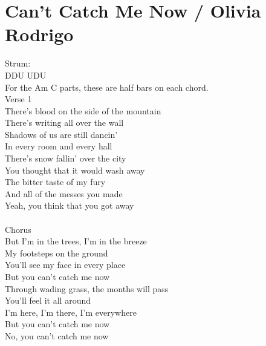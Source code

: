 \section{Can't Catch Me Now / Olivia Rodrigo}\label{sec:cantcatchmenow}

\Aminor
\Cmajor
\Fmajor
\Dminor
\Gmajor
\Eminor

Strum: \\
DDU UDU \\

For the Am C parts, these are half bars on each chord.\\

Verse 1\\
There's blood on the side of the mountain\\
There's writing all over the wall\\
Shadows of us are still dancin'\\
In every room and every hall\\
There's snow fallin' over the city\\
You thought that it would wash away\\
The bitter taste of my fury\\
And all of the messes you made\\
Yeah, you think that you got away\\
\\
Chorus\\
But I'm in the trees, I'm in the breeze\\
My footsteps on the ground\\
You'll see my face in every place\\
But you can't catch me now\\
Through wading grass, the months will pass\\
You'll feel it all around\\
I'm here, I'm there, I'm everywhere\\
But you can't catch me now\\
No, you can't catch me now \\
